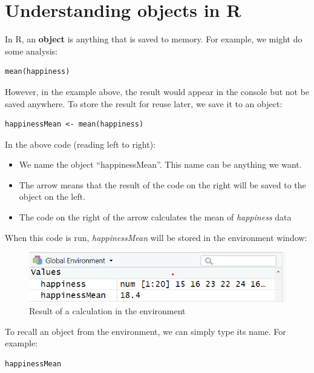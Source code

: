 \documentclass[
]{book}
\providecommand{\tightlist}{%
  \setlength{\itemsep}{0pt}\setlength{\parskip}{0pt}}
\begin{document}
\hypertarget{understanding-objects-in-r}{%
\section{Understanding objects in R}\label{understanding-objects-in-r}}

In R, an \textbf{object} is anything that is saved to memory. For example, we might do some analysis:

\begin{verbatim}
mean(happiness)
\end{verbatim}

However, in the example above, the result would appear in the console but not be saved anywhere. To store the result for reuse later, we save it to an object:

\begin{verbatim}
happinessMean <- mean(happiness)
\end{verbatim}

In the above code (reading left to right):

\begin{itemize}
\tightlist
\item
  We name the object ``happinessMean''. This name can be anything we want.
\item
  The arrow means that the result of the code on the right will be saved to the object on the left.
\item
  The code on the right of the arrow calculates the mean of \emph{happiness} data
\end{itemize}

When this code is run, \emph{happinessMean} will be stored in the environment window:

\begin{figure}
\centering
\includegraphics{images/saveobject.png}
\caption{Result of a calculation in the environment}
\end{figure}

To recall an object from the environment, we can simply type its name. For example:

\begin{verbatim}
happinessMean 
\end{verbatim}
\end{document}
